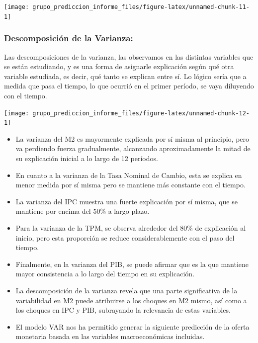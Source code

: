 \documentclass[
  12pt,
]{article}
\begin{document}
\begin{center}\texttt{[image: grupo\_prediccion\_informe\_files/figure-latex/unnamed-chunk-11-1]} \end{center}

\subsubsection{Descomposición de la
Varianza:}\label{descomposiciuxf3n-de-la-varianza}

Las descomposiciones de la varianza, las observamos en las distintas
variables que se están estudiando, y es una forma de asignarle
explicación según qué otra variable estudiada, es decir, qué tanto se
explican entre sí. Lo lógico sería que a medida que pasa el tiempo, lo
que ocurrió en el primer período, se vaya diluyendo con el tiempo.

\begin{center}\texttt{[image: grupo\_prediccion\_informe\_files/figure-latex/unnamed-chunk-12-1]} \end{center}

\begin{itemize}
\item
  La varianza del M2 es mayormente explicada por sí misma al principio,
  pero va perdiendo fuerza gradualmente, alcanzando aproximadamente la
  mitad de su explicación inicial a lo largo de 12 períodos.
\item
  En cuanto a la varianza de la Tasa Nominal de Cambio, esta se explica
  en menor medida por sí misma pero se mantiene más constante con el
  tiempo.
\item
  La varianza del IPC muestra una fuerte explicación por sí misma, que
  se mantiene por encima del 50\% a largo plazo.
\item
  Para la varianza de la TPM, se observa alrededor del 80\% de
  explicación al inicio, pero esta proporción se reduce
  considerablemente con el paso del tiempo.
\item
  Finalmente, en la varianza del PIB, se puede afirmar que es la que
  mantiene mayor consistencia a lo largo del tiempo en su explicación.
\item
  La descomposición de la varianza revela que una parte significativa de
  la variabilidad en M2 puede atribuirse a los choques en M2 mismo, así
  como a los choques en IPC y PIB, subrayando la relevancia de estas
  variables.
\item
  El modelo VAR nos ha permitido generar la siguiente predicción de la
  oferta monetaria basada en las variables macroeconómicas incluidas.
\end{itemize}
\end{document}
